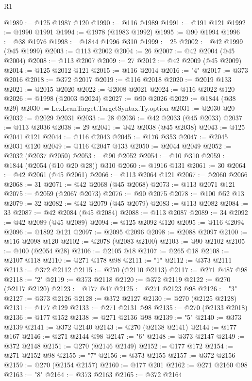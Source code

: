 \begin{lexlean}{R1}
\begin{coremodule}
@1989 := @125 @1987 @120
@1990 := @116 @1989
@1991 := @191 @121
@1992 := @1990 @1991
@1994 := @1978 (@1983 @1992)
@1995 := @90 @1994
@1996 := @38 @1976
@1998 := @1844 @1996 @310
@1999 := 25
@2002 := @42 @1999 (@45 @1999)
@2003 := @113 @2002
@2004 := 26
@2007 := @42 @2004 (@45 @2004)
@2008 := @113 @2007
@2009 := 27
@2012 := @42 @2009 (@45 @2009)
@2014 := @125 @2012 @121
@2015 := @116 @2014
@2016 := "4"
@2017 := @373 @2016
@2018 := @372 @2017
@2019 := @116 @2018
@2020 := @2019 @133
@2021 := @2015 @2020
@2022 := @2008 @2021
@2024 := @116 @2022 @120
@2026 := @1998 (@2003 @2024)
@2027 := @90 @2026
@2029 := @1844 (@38 @29)
@2030 := LexLeanTarget.TargetSyntax.Ty.option
@2031 := @2030 @20
@2032 := @2029 @2031
@2033 := 28
@2036 := @42 @2033 (@45 @2033)
@2037 := @113 @2036
@2038 := 29
@2041 := @42 @2038 (@45 @2038)
@2043 := @125 @2041 @121
@2044 := @116 @2043
@2045 := @176 @353
@2047 := @2045 @2031 @120
@2049 := @116 @2047 @133
@2050 := @2044 @2049
@2052 := @2032 (@2037 @2050)
@2053 := @90 @2052
@2054 := @10 @310
@2059 := @1844 (@2054 (@10 @20 @28)) @310
@2060 := @1916 @131
@2061 := 30
@2064 := @42 @2061 (@45 @2061)
@2066 := @113 @2064 @121
@2067 := @2060 @2066
@2068 := 31
@2071 := @42 @2068 (@45 @2068)
@2073 := @113 @2071 @121
@2075 := @2059 (@2067 @2073)
@2076 := @90 @2075
@2078 := @100 @52 @13
@2079 := 32
@2082 := @42 @2079 (@45 @2079)
@2083 := @113 @2082
@2084 := 33
@2087 := @42 @2084 (@45 @2084)
@2088 := @113 @2087
@2089 := 34
@2092 := @42 @2089 (@45 @2089)
@2094 := @125 @2092 @120
@2095 := @116 @2094
@2096 := @1892 @121
@2097 := @2095 @2096
@2098 := @2088 @2097
@2100 := @116 @2098 @120
@2102 := @2078 (@2083 @2100)
@2103 := @90 @2102
@2105 := @100 (@2054 @28)
@2106 := @2105 @18
@2107 := @265 @18
@2108 := @2107 @118
@2110 := @271 @178 @98
@2111 := "1"
@2112 := @373 @2111
@2113 := @372 @2112
@2115 := @270 (@2110 @2113)
@2117 := @271 @487 @98
@2118 := "2"
@2119 := @373 @2118
@2120 := @372 @2119
@2122 := @270 (@2117 @2120)
@2123 := @177 @47
@2125 := @271 @2123 @98
@2126 := "3"
@2127 := @373 @2126
@2128 := @372 @2127
@2130 := @270 (@2125 @2128)
@2131 := @177 @129
@2133 := @271 @2131 @98
@2135 := @270 (@2133 @2018)
@2136 := @177 @152
@2138 := @271 @2136 @98
@2139 := "5"
@2140 := @373 @2139
@2141 := @372 @2140
@2143 := @270 (@2138 @2141)
@2144 := @177 @167
@2146 := @271 @2144 @98
@2147 := "6"
@2148 := @373 @2147
@2149 := @372 @2148
@2151 := @270 (@2146 @2149)
@2152 := @177 @172
@2154 := @271 @2152 @98
@2155 := "7"
@2156 := @373 @2155
@2157 := @372 @2156
@2159 := @270 (@2154 @2157)
@2160 := @177 @201
@2162 := @271 @2160 @98
@2163 := "8"
@2164 := @373 @2163
@2165 := @372 @2164

\end{coremodule}
\end{lexlean}
